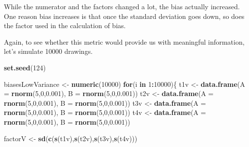 \documentclass[10pt,dvipsnames,enabledeprecatedfontcommands]{scrartcl}
\newenvironment{Shaded}{\begin{snugshade}}{\end{snugshade}}
\newcommand{\KeywordTok}[1]{\textcolor[rgb]{0.13,0.29,0.53}{\textbf{#1}}}
\newcommand{\DataTypeTok}[1]{\textcolor[rgb]{0.13,0.29,0.53}{#1}}
\newcommand{\DecValTok}[1]{\textcolor[rgb]{0.00,0.00,0.81}{#1}}
\newcommand{\FloatTok}[1]{\textcolor[rgb]{0.00,0.00,0.81}{#1}}
\newcommand{\StringTok}[1]{\textcolor[rgb]{0.31,0.60,0.02}{#1}}
\newcommand{\ControlFlowTok}[1]{\textcolor[rgb]{0.13,0.29,0.53}{\textbf{#1}}}
\newcommand{\OperatorTok}[1]{\textcolor[rgb]{0.81,0.36,0.00}{\textbf{#1}}}
\newcommand{\NormalTok}[1]{#1}
\begin{document}
\normalsize

While the numerator and the factors changed a lot, the bias actually
increased. One reason bias increases is that once the standard deviation
goes down, so does the factor used in the calculation of bias.

Again, to see whether this metric would provide us with meaningful
information, let's simulate 10000 drawings.

\vspace{1mm} \footnotesize

\begin{Shaded}
\begin{Highlighting}[]
\KeywordTok{set.seed}\NormalTok{(}\DecValTok{124}\NormalTok{)}

\NormalTok{biasesLowVariance <-}\StringTok{ }\KeywordTok{numeric}\NormalTok{(}\DecValTok{10000}\NormalTok{)}
\ControlFlowTok{for}\NormalTok{(i }\ControlFlowTok{in} \DecValTok{1}\OperatorTok{:}\DecValTok{10000}\NormalTok{)\{}
\NormalTok{t1v <-}\StringTok{ }\KeywordTok{data.frame}\NormalTok{(}\DataTypeTok{A  =} \KeywordTok{rnorm}\NormalTok{(}\DecValTok{5}\NormalTok{,}\DecValTok{0}\NormalTok{,}\FloatTok{0.001}\NormalTok{), }\DataTypeTok{B =} \KeywordTok{rnorm}\NormalTok{(}\DecValTok{5}\NormalTok{,}\DecValTok{0}\NormalTok{,}\FloatTok{0.001}\NormalTok{))}
\NormalTok{t2v <-}\StringTok{ }\KeywordTok{data.frame}\NormalTok{(}\DataTypeTok{A  =} \KeywordTok{rnorm}\NormalTok{(}\DecValTok{5}\NormalTok{,}\DecValTok{0}\NormalTok{,}\FloatTok{0.001}\NormalTok{), }\DataTypeTok{B =} \KeywordTok{rnorm}\NormalTok{(}\DecValTok{5}\NormalTok{,}\DecValTok{0}\NormalTok{,}\FloatTok{0.001}\NormalTok{))}
\NormalTok{t3v <-}\StringTok{ }\KeywordTok{data.frame}\NormalTok{(}\DataTypeTok{A  =} \KeywordTok{rnorm}\NormalTok{(}\DecValTok{5}\NormalTok{,}\DecValTok{0}\NormalTok{,}\FloatTok{0.001}\NormalTok{), }\DataTypeTok{B =} \KeywordTok{rnorm}\NormalTok{(}\DecValTok{5}\NormalTok{,}\DecValTok{0}\NormalTok{,}\FloatTok{0.001}\NormalTok{))}
\NormalTok{t4v <-}\StringTok{ }\KeywordTok{data.frame}\NormalTok{(}\DataTypeTok{A  =} \KeywordTok{rnorm}\NormalTok{(}\DecValTok{5}\NormalTok{,}\DecValTok{0}\NormalTok{,}\FloatTok{0.001}\NormalTok{), }\DataTypeTok{B =} \KeywordTok{rnorm}\NormalTok{(}\DecValTok{5}\NormalTok{,}\DecValTok{0}\NormalTok{,}\FloatTok{0.001}\NormalTok{))}

\NormalTok{factorV <-}\StringTok{ }\KeywordTok{sd}\NormalTok{(}\KeywordTok{c}\NormalTok{(}\KeywordTok{s}\NormalTok{(t1v),}\KeywordTok{s}\NormalTok{(t2v),}\KeywordTok{s}\NormalTok{(t3v),}\KeywordTok{s}\NormalTok{(t4v)))}


\end{Highlighting}
\end{Shaded}
\end{document}
